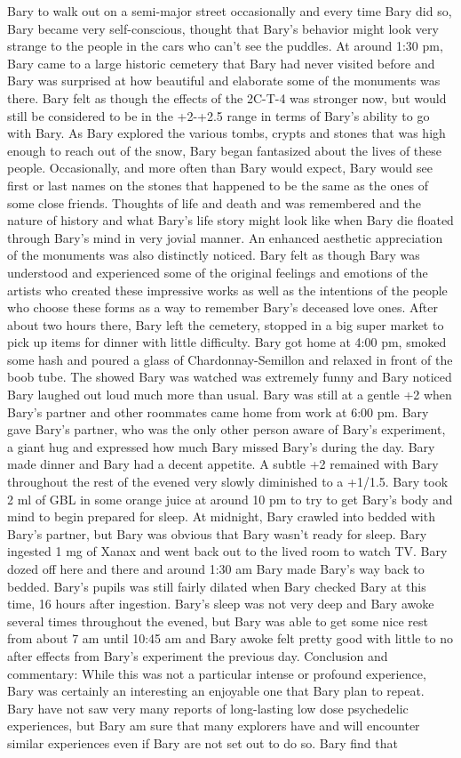 \documentclass[12pt]{book}
\begin{document}
Bary to walk out on a semi-major street occasionally and every time Bary did so, Bary became very self-conscious, thought that Bary's behavior might look very strange to the people in the cars who can't see the puddles. At around 1:30 pm, Bary came to a large historic cemetery that Bary had never visited before and Bary was surprised at how beautiful and elaborate some of the monuments was there. Bary felt as though the effects of the 2C-T-4 was stronger now, but would still be considered to be in the +2-+2.5 range in terms of Bary's ability to go with Bary. As Bary explored the various tombs, crypts and stones that was high enough to reach out of the snow, Bary began fantasized about the lives of these people. Occasionally, and more often than Bary would expect, Bary would see first or last names on the stones that happened to be the same as the ones of some close friends. Thoughts of life and death and was remembered and the nature of history and what Bary's life story might look like when Bary die floated through Bary's mind in very jovial manner. An enhanced aesthetic appreciation of the monuments was also distinctly noticed. Bary felt as though Bary was understood and experienced some of the original feelings and emotions of the artists who created these impressive works as well as the intentions of the people who choose these forms as a way to remember Bary's deceased love ones. After about two hours there, Bary left the cemetery, stopped in a big super market to pick up items for dinner with little difficulty. Bary got home at 4:00 pm, smoked some hash and poured a glass of Chardonnay-Semillon and relaxed in front of the boob tube. The showed Bary was watched was extremely funny and Bary noticed Bary laughed out loud much more than usual. Bary was still at a gentle +2 when Bary's partner and other roommates came home from work at 6:00 pm. Bary gave Bary's partner, who was the only other person aware of Bary's experiment, a giant hug and expressed how much Bary missed Bary's during the day. Bary made dinner and Bary had a decent appetite. A subtle +2 remained with Bary throughout the rest of the evened very slowly diminished to a +1/1.5. Bary took 2 ml of GBL in some orange juice at around 10 pm to try to get Bary's body and mind to begin prepared for sleep. At midnight, Bary crawled into bedded with Bary's partner, but Bary was obvious that Bary wasn't ready for sleep. Bary ingested 1 mg of Xanax and went back out to the lived room to watch TV. Bary dozed off here and there and around 1:30 am Bary made Bary's way back to bedded. Bary's pupils was still fairly dilated when Bary checked Bary at this time, 16 hours after ingestion. Bary's sleep was not very deep and Bary awoke several times throughout the evened, but Bary was able to get some nice rest from about 7 am until 10:45 am and Bary awoke felt pretty good with little to no after effects from Bary's experiment the previous day. Conclusion and commentary: While this was not a particular intense or profound experience, Bary was certainly an interesting an enjoyable one that Bary plan to repeat. Bary have not saw very many reports of long-lasting low dose psychedelic experiences, but Bary am sure that many explorers have and will encounter similar experiences even if Bary are not set out to do so. Bary find that 
\end{document}
